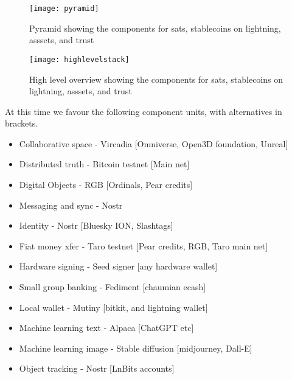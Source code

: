 \begin{figure*}[ht]\centering 	\texttt{[image: pyramid]}
	\caption{Pyramid showing the components for sats, stablecoins on lightning, asssets, and trust}
	\label{fig:pyramind}
\end{figure*}

\begin{figure*}[ht]\centering 	\texttt{[image: highlevelstack]}
	\caption{High level overview showing the components for sats, stablecoins on lightning, asssets, and trust}
	\label{fig:highlevelstack}
\end{figure*}

At this time we favour the following component units, with alternatives in brackets.
\begin{itemize}
\item Collaborative space - Vircadia [Omniverse, Open3D foundation, Unreal]
\item Distributed truth - Bitcoin testnet [Main net]
\item Digital Objects - RGB [Ordinals, Pear credits]
\item Messaging and sync - Nostr 
\item Identity - Nostr [Bluesky ION, Slashtags]
\item Fiat money xfer - Taro testnet [Pear credits, RGB, Taro main net]
\item Hardware signing - Seed signer [any hardware wallet]
\item Small group banking - Fediment [chaumian ecash]
\item Local wallet - Mutiny [bitkit, and lightning wallet]
\item Machine learning text - Alpaca [ChatGPT etc]
\item Machine learning image - Stable diffusion [midjourney, Dall-E]
\item Object tracking - Nostr [LnBits accounts]
\end{itemize}

